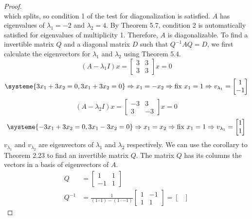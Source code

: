 \documentclass[11pt]{scrartcl}
\begin{document}
\begin{enumerate}[label=\alph*.]
{\begin{proof}
\[		      \]
		      which splits, so condition 1 of the test for diagonalization is satisfied.
		      $A$ has eigenvalues of $\lambda_1 = -2 $ and $\lambda_2 = 4 $. By Theorem 5.7, condition 2
		      is automatically satisfied for eigenvalues of multiplicity 1. Therefore, $A$ is diagonalizable.
		      To find a invertible matrix $Q$ and a diagonal matrix $D$ such that $Q^{-1} A Q=D$, we first
		      calculate the eigenvectors for $\lambda_1$ and $\lambda_2$ using Theorem 5.4.
		      \[
			      (A - \lambda_1I)x =  \begin{bmatrix}3 & 3 \\ 3 & 3 \end{bmatrix}x = 0
		      \]
		      \[
			      \systeme{
				      3x_1 + 3x_2 = 0,
				      3x_1 + 3x_2 = 0
			      }
			      \Rightarrow x_1 = -x_2
			      \Rightarrow \text{fix } x_1 = 1
			      \Rightarrow v_{\lambda_1} =  \begin{bmatrix}1 \\-1 \end{bmatrix}
		      \]
		      \[
			      (A - \lambda_2I)x = \begin{bmatrix}-3 & 3 \\ 3 & -3  \end{bmatrix}x = 0
		      \]
		      \[
			      \systeme{
				      -3x_1 + 3x_2 = 0,
				      3x_1 - 3x_2 = 0
			      }
			      \Rightarrow x_1 = x_2
			      \Rightarrow \text{fix } x_1 = 1
			      \Rightarrow v_{\lambda_1} =  \begin{bmatrix}1 \\1  \end{bmatrix}
		      \]
		      $v_{\lambda_1}$ and $v_{\lambda_2}$ are eigenvectors of $\lambda_1$ and $\lambda_2$ respectively.
		      We can use the corollary to Theorem 2.23 to find an invertible matrix $Q$.
		      The matrix $Q$ has its columns the vectors in a basis of eigenvectors of $A$.
		      \begin{align*}
			      Q      & = \begin{bmatrix}
				      1  & 1 \\
				      -1 & 1
			      \end{bmatrix}       \\
			      Q^{-1} & = \frac{1}{(1\cdot1) - (1\cdot-1)}
			      \begin{bmatrix}
				      1 & -1 \\
				      1 & 1
			      \end{bmatrix}
			      = 	\begin{bmatrix}

\end{bmatrix}
\end{align*}
\end{proof}}
\end{enumerate}
\end{document}
